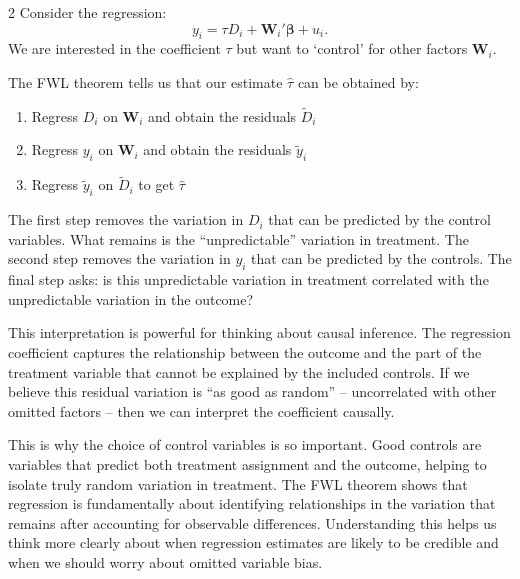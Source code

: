 \documentclass[12pt]{article}
\begin{document}
\begin{multicols}{2}
Consider the regression:
$$y_i = \tau D_i + \bm{W}_i'\boldsymbol{\beta} + u_i.$$
We are interested in the coefficient $\tau$ but want to `control' for other factors $\bm{W}_i$.

The FWL theorem tells us that our estimate $\hat{\tau}$ can be obtained by:
\begin{enumerate}
\item Regress $D_i$ on $\bm{W}_i$ and obtain the residuals $\tilde{D}_i$
\item Regress $y_i$ on $\bm{W}_i$ and obtain the residuals $\tilde{y}_i$  
\item Regress $\tilde{y}_i$ on $\tilde{D}_i$ to get $\hat{\tau}$
\end{enumerate}

The first step removes the variation in $D_i$ that can be predicted by the control variables.
What remains is the ``unpredictable'' variation in treatment.
The second step removes the variation in $y_i$ that can be predicted by the controls.
The final step asks: is this unpredictable variation in treatment correlated with the unpredictable variation in the outcome?

This interpretation is powerful for thinking about causal inference.
The regression coefficient captures the relationship between the outcome and the part of the treatment variable that cannot be explained by the included controls.
If we believe this residual variation is ``as good as random'' -- uncorrelated with other omitted factors -- then we can interpret the coefficient causally.

This is why the choice of control variables is so important.
Good controls are variables that predict both treatment assignment and the outcome, helping to isolate truly random variation in treatment.
The FWL theorem shows that regression is fundamentally about identifying relationships in the variation that remains after accounting for observable differences.
Understanding this helps us think more clearly about when regression estimates are likely to be credible and when we should worry about omitted variable bias.

\end{multicols}
\end{document}
